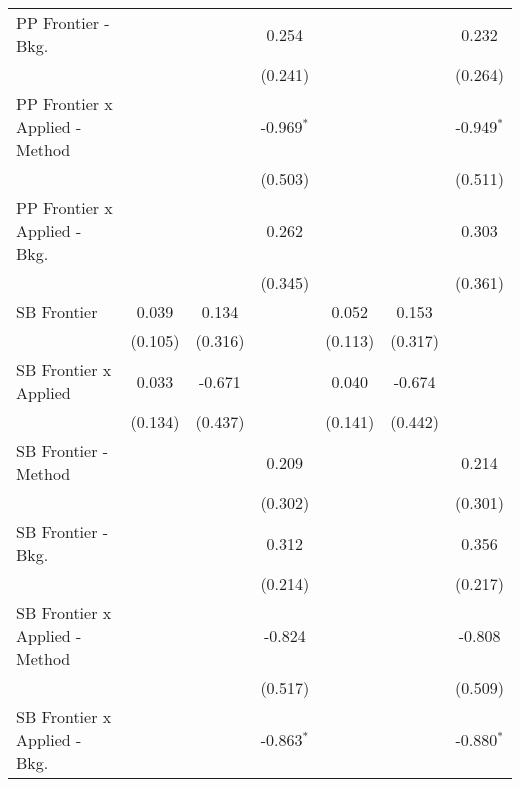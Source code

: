 \begin{tabular}{lcccccc}
   PP Frontier - Bkg.             &               &         & 0.254        &              &         & 0.232\\   
                                  &               &         & (0.241)      &              &         & (0.264)\\   
   PP Frontier x Applied - Method &               &         & -0.969$^{*}$ &              &         & -0.949$^{*}$\\   
                                  &               &         & (0.503)      &              &         & (0.511)\\   
   PP Frontier x Applied - Bkg.   &               &         & 0.262        &              &         & 0.303\\   
                                  &               &         & (0.345)      &              &         & (0.361)\\   
   SB Frontier                    & 0.039         & 0.134   &              & 0.052        & 0.153   &   \\   
                                  & (0.105)       & (0.316) &              & (0.113)      & (0.317) &   \\   
   SB Frontier x Applied          & 0.033         & -0.671  &              & 0.040        & -0.674  &   \\   
                                  & (0.134)       & (0.437) &              & (0.141)      & (0.442) &   \\   
   SB Frontier - Method           &               &         & 0.209        &              &         & 0.214\\   
                                  &               &         & (0.302)      &              &         & (0.301)\\   
   SB Frontier - Bkg.             &               &         & 0.312        &              &         & 0.356\\   
                                  &               &         & (0.214)      &              &         & (0.217)\\   
   SB Frontier x Applied - Method &               &         & -0.824       &              &         & -0.808\\   
                                  &               &         & (0.517)      &              &         & (0.509)\\   
   SB Frontier x Applied - Bkg.   &               &         & -0.863$^{*}$ &              &         & -0.880$^{*}$\\   

\end{tabular}
